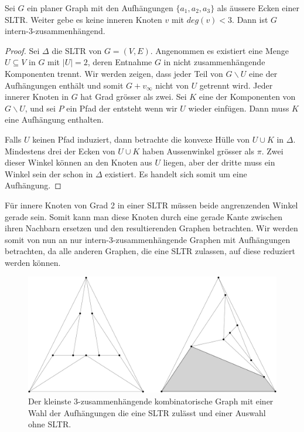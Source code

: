 \begin{proposition}\cite[Proposition 1.2]{af13}
Sei $G$ ein planer Graph mit den Aufhängungen $\{a_1,a_2,a_3\}$ als äussere Ecken einer SLTR. Weiter gebe es keine inneren Knoten $v$ mit $deg(v) < 3$. Dann ist $G$ intern-3-zusammenhängend.
\end{proposition}

\begin{proof}
Sei $\Delta$ die SLTR von $G=(V,E)$. Angenommen es existiert eine Menge $U \subseteq V$ in $G$ mit $|U| = 2$, deren Entnahme $G$ in nicht zusammenhängende Komponenten trennt. Wir werden zeigen, dass jeder Teil von $G\backslash U$ eine der Aufhängungen enthält und somit $G + v_\infty$ nicht von $U$ getrennt wird. Jeder innerer Knoten in $G$ hat Grad grösser als zwei. Sei $K$ eine der Komponenten von $G\backslash U$, und sei $P$ ein Pfad der entsteht wenn wir $U$ wieder einfügen. Dann muss $K$ eine Aufhängung enthalten.

Falls $U$ keinen Pfad induziert, dann betrachte die konvexe Hülle von $U \cup K$ in $\Delta$. Mindestens drei der Ecken von $U \cup K$ haben Aussenwinkel grösser als $\pi$. Zwei dieser Winkel können an den Knoten aus $U$ liegen, aber der dritte muss ein Winkel sein der schon in $\Delta$ existiert. Es handelt sich somit um eine Aufhängung.


\end{proof}

\begin{remark}
Für innere Knoten von Grad 2 in einer SLTR müssen beide angrenzenden Winkel gerade sein. Somit kann man diese Knoten durch eine gerade Kante zwischen ihren Nachbarn ersetzen und den resultierenden Graphen betrachten. Wir werden somit von nun an nur intern-3-zusammenhängende Graphen mit Aufhängungen betrachten, da alle anderen Graphen, die eine SLTR zulassen, auf diese reduziert werden können.
\end{remark}

\begin{figure}[h]
	\centering
  \includegraphics[scale=0.1]{10_example.png}
	\caption{Der kleinste 3-zusammenhängende kombinatorische Graph mit einer Wahl der Aufhängungen die eine SLTR zulässt und einer Auswahl ohne SLTR.}
	\label{10_example}
\end{figure}

